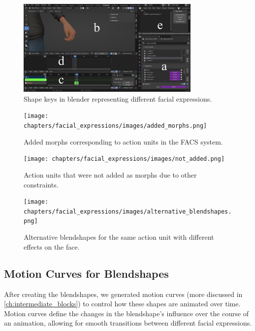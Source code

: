 \documentclass[../../main.tex]{subfiles}
\begin{document}
\begin{figure}
    \centering
    \includegraphics[width=0.8\textwidth]{chapters/facial_expressions/images/shape_keys.png}
    \caption{Shape keys in blender representing different facial expressions.}
    \label{fig:shape_keys}
\end{figure}

\begin{figure}
    \centering
    \texttt{[image: chapters/facial\_expressions/images/added\_morphs.png]}
    \caption{Added morphs corresponding to action units in the FACS system.}
    \label{fig:added_morphs}
\end{figure}

\begin{figure}
    \centering
    \texttt{[image: chapters/facial\_expressions/images/not\_added.png]}
    \caption{Action units that were not added as morphs due to other constraints.}
    \label{fig:not_added}
\end{figure}

\begin{figure}
    \centering
    \texttt{[image: chapters/facial\_expressions/images/alternative\_blendshapes.png]}
    \caption{Alternative blendshapes for the same action unit with different effects on the face.}
    \label{fig:alternative_blendshapes}
\end{figure}


\subsection{Motion Curves for Blendshapes}
\label{ch:facial_expressions:motion_curves_for_blendshapes}

After creating the blendshapes, we generated motion curves (more discussed in \ref{ch:intermediate_blocks}) to control how these shapes are animated over time. Motion curves define the changes in the blendshape's influence over the course of an animation, allowing for smooth transitions between different facial expressions.
\end{document}
